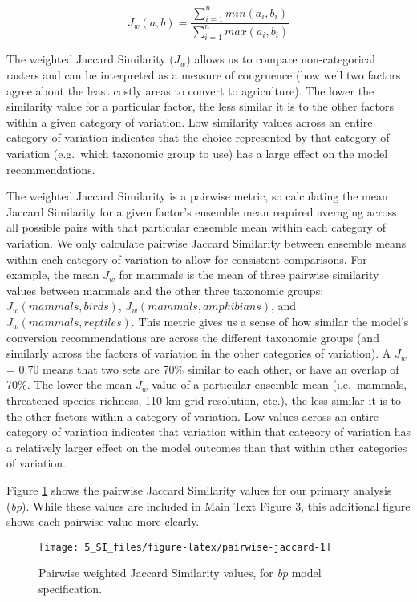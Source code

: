 \documentclass[
]{article}
\begin{document}
\begin{equation}
J_{w} (a,b) = \frac{\sum_{i=1}^n min(a_{i}, b_{i})}{\sum_{i=1}^n max(a_{i}, b_{i})} \label{eq:jac-w}
\end{equation}

The weighted Jaccard Similarity (\(J_w\)) allows us to compare non-categorical rasters and can be interpreted as a measure of congruence (how well two factors agree about the least costly areas to convert to agriculture). The lower the similarity value for a particular factor, the less similar it is to the other factors within a given category of variation. Low similarity values across an entire category of variation indicates that the choice represented by that category of variation (e.g.~which taxonomic group to use) has a large effect on the model recommendations.

The weighted Jaccard Similarity is a pairwise metric, so calculating the mean Jaccard Similarity for a given factor's ensemble mean required averaging across all possible pairs with that particular ensemble mean within each category of variation. We only calculate pairwise Jaccard Similarity between ensemble means within each category of variation to allow for consistent comparisons. For example, the mean \(J_w\) for mammals is the mean of three pairwise similarity values between mammals and the other three taxonomic groups: \(J_w(mammals, birds)\), \(J_w(mammals,amphibians)\), and \(J_w(mammals,reptiles)\). This metric gives us a sense of how similar the model's conversion recommendations are across the different taxonomic groups (and similarly across the factors of variation in the other categories of variation). A \(J_w\) = 0.70 means that two sets are 70\% similar to each other, or have an overlap of 70\%. The lower the mean \(J_w\) value of a particular ensemble mean (i.e.~mammals, threatened species richness, 110 km grid resolution, etc.), the less similar it is to the other factors within a category of variation. Low values across an entire category of variation indicates that variation within that category of variation has a relatively larger effect on the model outcomes than that within other categories of variation.

Figure \ref{fig:pairwise-jaccard} shows the pairwise Jaccard Similarity values for our primary analysis (\emph{bp}). While these values are included in Main Text Figure 3, this additional figure shows each pairwise value more clearly.



\begin{figure}
\texttt{[image: 5\_SI\_files/figure-latex/pairwise-jaccard-1]} \caption{Pairwise weighted Jaccard Similarity values, for \emph{bp} model specification.}\label{fig:pairwise-jaccard}
\end{figure}
\end{document}
